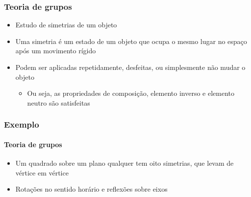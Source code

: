 \documentclass[12pt]{beamer}
\begin{document}
\begin{frame}
  \frametitle{Teoria de grupos}
  \begin{itemize}
    \item<1-> Estudo de simetrias de um objeto
    \item<1-> Uma simetria é um estado de um objeto que ocupa o mesmo lugar no
        espaço após um movimento rígido
    \item<2-> Podem ser aplicadas repetidamente, desfeitas, ou simplesmente não
        mudar o objeto
    \begin{itemize}[itemsep=0pt]
      \item Ou seja, as propriedades de composição, elemento inverso e elemento
          neutro são satisfeitas
    \end{itemize}
  \end{itemize}
\end{frame}

\begin{frame}
  \frametitle{Exemplo}
  \framesubtitle{Teoria de grupos}
  \begin{figure}[htbp]
  \end{figure}
  \begin{itemize}
    \item Um quadrado sobre um plano qualquer tem oito simetrias, que levam de
      vértice em vértice
    \item Rotações no sentido horário e reflexões sobre eixos
  \end{itemize}
\end{frame}
\end{document}
